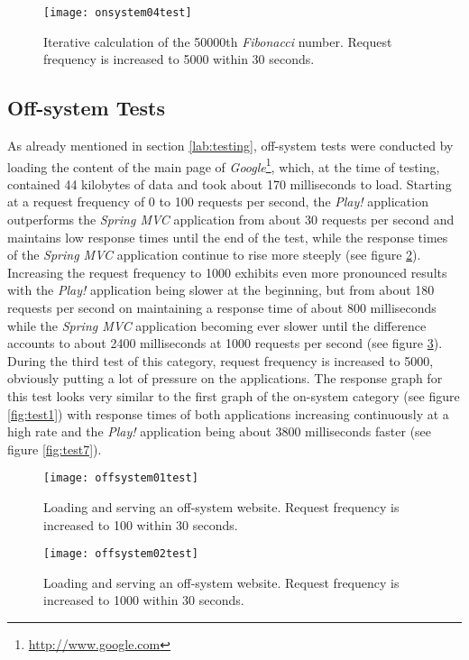 \begin{figure}
\centering\small
\setlength{\tabcolsep}{0mm}
  \texttt{[image: onsystem04test]}
\caption{Iterative calculation of the 50000th \textit{Fibonacci} number. Request frequency is increased to 5000 within 30 seconds.
}
\label{fig:test4} 
\end{figure}

\subsection*{Off-system Tests}
As already mentioned in section \ref{lab:testing}, off-system tests were conducted by loading the content of the main page of \textit{Google}\footnote{\url{http://www.google.com}}, which, at the time of testing, contained 44 kilobytes of data and took about 170 milliseconds to load. Starting at a request frequency of 0 to 100 requests per second, the \textit{Play!} application outperforms the \textit{Spring MVC} application from about 30 requests per second and maintains low response times until the end of the test, while the response times of the \textit{Spring MVC} application continue to rise more steeply (see figure \ref{fig:test5}). Increasing the request frequency to 1000 exhibits even more pronounced results with the \textit{Play!} application being slower at the beginning, but from about 180 requests per second on maintaining a response time of about 800 milliseconds while the \textit{Spring MVC} application becoming ever slower until the difference accounts to about 2400 milliseconds at 1000 requests per second (see figure \ref{fig:test6}). During the third test of this category, request frequency is increased to 5000, obviously putting a lot of pressure on the applications. The response graph for this test looks very similar to the first graph of the on-system category (see figure \ref{fig:test1}) with response times of both applications increasing continuously at a high rate and the \textit{Play!} application being about 3800 milliseconds faster (see figure \ref{fig:test7}).


\begin{figure}
\centering\small
\setlength{\tabcolsep}{0mm}
  \texttt{[image: offsystem01test]}
\caption{Loading and serving an off-system website. Request frequency is increased to 100 within 30 seconds.
}
\label{fig:test5} 
\end{figure}

\begin{figure}
\centering\small
\setlength{\tabcolsep}{0mm}
  \texttt{[image: offsystem02test]}
\caption{Loading and serving an off-system website. Request frequency is increased to 1000 within 30 seconds.
}
\label{fig:test6} 
\end{figure}

